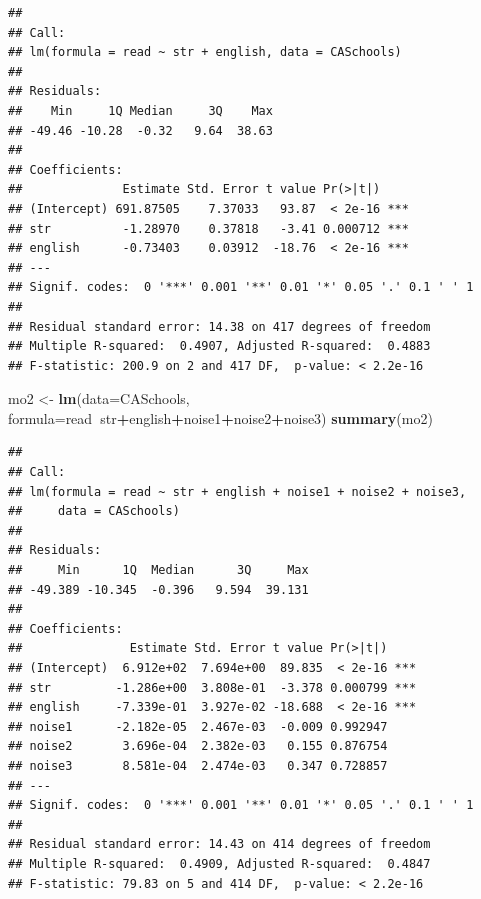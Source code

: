 \documentclass[
]{book}
\newenvironment{Shaded}{\begin{snugshade}}{\end{snugshade}}
\newcommand{\DataTypeTok}[1]{\textcolor[rgb]{0.13,0.29,0.53}{#1}}
\newcommand{\KeywordTok}[1]{\textcolor[rgb]{0.13,0.29,0.53}{\textbf{#1}}}
\newcommand{\NormalTok}[1]{#1}
\newcommand{\OperatorTok}[1]{\textcolor[rgb]{0.81,0.36,0.00}{\textbf{#1}}}
\newcommand{\StringTok}[1]{\textcolor[rgb]{0.31,0.60,0.02}{#1}}
\begin{document}
\begin{verbatim}
## 
## Call:
## lm(formula = read ~ str + english, data = CASchools)
## 
## Residuals:
##    Min     1Q Median     3Q    Max 
## -49.46 -10.28  -0.32   9.64  38.63 
## 
## Coefficients:
##              Estimate Std. Error t value Pr(>|t|)    
## (Intercept) 691.87505    7.37033   93.87  < 2e-16 ***
## str          -1.28970    0.37818   -3.41 0.000712 ***
## english      -0.73403    0.03912  -18.76  < 2e-16 ***
## ---
## Signif. codes:  0 '***' 0.001 '**' 0.01 '*' 0.05 '.' 0.1 ' ' 1
## 
## Residual standard error: 14.38 on 417 degrees of freedom
## Multiple R-squared:  0.4907, Adjusted R-squared:  0.4883 
## F-statistic: 200.9 on 2 and 417 DF,  p-value: < 2.2e-16
\end{verbatim}

\begin{Shaded}
\begin{Highlighting}[]
\NormalTok{mo2 <-}\StringTok{ }\KeywordTok{lm}\NormalTok{(}\DataTypeTok{data=}\NormalTok{CASchools, }\DataTypeTok{formula=}\NormalTok{read}\OperatorTok{~}\NormalTok{str}\OperatorTok{+}\NormalTok{english}\OperatorTok{+}\NormalTok{noise1}\OperatorTok{+}\NormalTok{noise2}\OperatorTok{+}\NormalTok{noise3)}
\KeywordTok{summary}\NormalTok{(mo2)}
\end{Highlighting}
\end{Shaded}

\begin{verbatim}
## 
## Call:
## lm(formula = read ~ str + english + noise1 + noise2 + noise3, 
##     data = CASchools)
## 
## Residuals:
##     Min      1Q  Median      3Q     Max 
## -49.389 -10.345  -0.396   9.594  39.131 
## 
## Coefficients:
##               Estimate Std. Error t value Pr(>|t|)    
## (Intercept)  6.912e+02  7.694e+00  89.835  < 2e-16 ***
## str         -1.286e+00  3.808e-01  -3.378 0.000799 ***
## english     -7.339e-01  3.927e-02 -18.688  < 2e-16 ***
## noise1      -2.182e-05  2.467e-03  -0.009 0.992947    
## noise2       3.696e-04  2.382e-03   0.155 0.876754    
## noise3       8.581e-04  2.474e-03   0.347 0.728857    
## ---
## Signif. codes:  0 '***' 0.001 '**' 0.01 '*' 0.05 '.' 0.1 ' ' 1
## 
## Residual standard error: 14.43 on 414 degrees of freedom
## Multiple R-squared:  0.4909, Adjusted R-squared:  0.4847 
## F-statistic: 79.83 on 5 and 414 DF,  p-value: < 2.2e-16
\end{verbatim}
\end{document}
